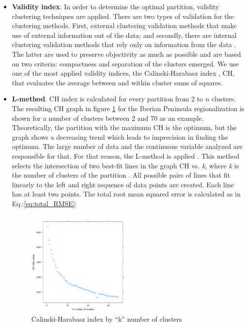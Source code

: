 \begin{itemize}
\item \textbf{Validity index}. In order to determine the optimal partition, validity clustering techniques are applied. There are two types of validation for the clustering methods. First, external clustering validation methods that make use of external information out of the data; and secondly, there are internal clustering validation methods that rely only on information from the data \cite*{Liu2010}. The latter are used to preserve objectivity as much as possible and are based on two criteria: compactness and separation of the clusters emerged. We use one of the most applied validity indices, the Calinski-Harabasz index \cite*{CalinskiH}, CH, that evaluates the average between and within cluster sums of squares.
\item \textbf{L-method}. CH index is calculated for every partition from 2 to $n$ clusters. The resulting CH graph in figure \ref{CHindex} for the Iberian Peninsula regionalization is shown for a number of clusters between 2 and 70 as an example. Theoretically, the partition with the maximum CH is the optimum, but the graph shows a decreasing trend which leads to imprecision in finding the optimum. The large number of data and the continuous variable analyzed are responsible for that. For that reason, the L-method is applied \cite*{Salvador2004}. This method selects the intersection of two best-fit lines in the graph CH vs. \textit{k}, where \textit{k} is the number of clusters of the partition \cite*{Zagouras2013}. All possible pairs of lines that fit linearly to the left and right sequence of data points are created. Each line has at least two points. The total root mean squared error is calculated as in Eq.:\ref{eq:total_RMSE}:

\begin{figure}[h!]
\centering\includegraphics[width=0.5\textwidth]{figs/capitulo5/CHindex}
\caption[Calinski-Harabasz index by number of clusters]{Calinski-Harabasz index by ``k'' number of clusters}
\label{CHindex}
\end{figure}
 

\end{itemize}
